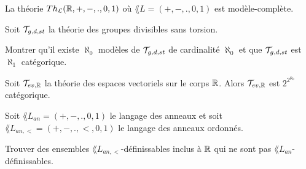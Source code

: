 \documentclass[a4paper, 12pt]{report}
\begin{document}
\begin{answer}

\end{answer}

\begin{exercice}
	\label{exercice:real_ring_modele_complete}
	La théorie $Th_{\mathcal{L}}{(\mathbb{R}, +, -, ., 0, 1)}$ où $\lang{L} = (+, -, .,
	0, 1)$ est modèle-complète.
\end{exercice}

\begin{answer}

\end{answer}

\begin{exercice}
	\label{exercice:groupe_divisible_sans_torsion_aleph_0_model}
	Soit $\mathcal{T}_{g, d, st}$ la théorie des groupes divisibles sans torsion.

	Montrer qu'il existe $\aleph_{0}$ modèles de $\mathcal{T}_{g, d, st}$ de
	cardinalité $\aleph_{0}$ et que $\mathcal{T}_{g, d, st}$ est $\aleph_{1}$
	catégorique.
\end{exercice}

\begin{answer}

\end{answer}

\begin{exercice}
	\label{exercice:real_ev_kappa_categorique}
	Soit $\mathcal{T}_{ev, \mathbb{R}}$ la théorie des espaces vectoriels sur le corps
	$\mathbb{R}$. Alors $\mathcal{T}_{ev, \mathbb{R}}$ est $2^{2^{\aleph_{0}}}$
	catégorique.
\end{exercice}

\begin{answer}

\end{answer}

\begin{exercice}
	Soit $\lang{L}_{an} = (+, -, ., 0, 1)$ le langage des anneaux et soit
	$\lang{L}_{an, <} = (+, -, ., <, 0, 1)$ le langage des anneaux ordonnés.

	Trouver des ensembles $\lang{L}_{an, <}$-définissables inclus à $\mathbb{R}$ qui ne sont pas
	$\lang{L}_{an}$-définissables.
\end{exercice}

\begin{answer}

\end{answer}
\end{document}
